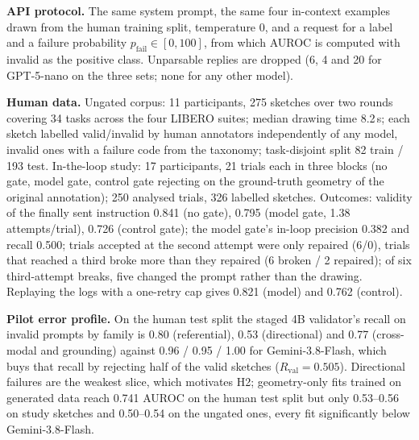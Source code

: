 \documentclass{article} %
\begin{document}
\textbf{API protocol.} The same system prompt, the same four in-context examples drawn from the human training split, temperature 0, and a request for a label and a failure probability $p_{\mathrm{fail}}\in[0,100]$, from which AUROC is computed with invalid as the positive class. Unparsable replies are dropped (6, 4 and 20 for GPT-5-nano on the three sets; none for any other model).

\textbf{Human data.} Ungated corpus: 11 participants, 275 sketches over two rounds covering 34 tasks across the four LIBERO suites; median drawing time 8.2\,s; each sketch labelled valid/invalid by human annotators independently of any model, invalid ones with a failure code from the taxonomy; task-disjoint split 82 train / 193 test. In-the-loop study: 17 participants, 21 trials each in three blocks (no gate, model gate, control gate rejecting on the ground-truth geometry of the original annotation); 250 analysed trials, 326 labelled sketches. Outcomes: validity of the finally sent instruction 0.841 (no gate), 0.795 (model gate, 1.38 attempts/trial), 0.726 (control gate); the model gate's in-loop precision 0.382 and recall 0.500; trials accepted at the second attempt were only repaired (6/0), trials that reached a third broke more than they repaired (6 broken / 2 repaired); of six third-attempt breaks, five changed the prompt rather than the drawing. Replaying the logs with a one-retry cap gives 0.821 (model) and 0.762 (control).

\textbf{Pilot error profile.} On the human test split the staged 4B validator's recall on invalid prompts by family is 0.80 (referential), 0.53 (directional) and 0.77 (cross-modal and grounding) against 0.96 / 0.95 / 1.00 for Gemini-3.8-Flash, which buys that recall by rejecting half of the valid sketches ($R_{\mathrm{val}}=0.505$). Directional failures are the weakest slice, which motivates H2; geometry-only fits trained on generated data reach 0.741 AUROC on the human test split but only 0.53--0.56 on study sketches and 0.50--0.54 on the ungated ones, every fit significantly below Gemini-3.8-Flash.
\end{document}
